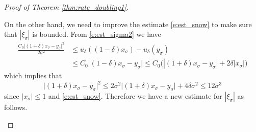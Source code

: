 \documentclass[11pt,reqno]{amsart}
\numberwithin{figure}{section}
\theoremstyle{plain}
\theoremstyle{remark}
\numberwithin{equation}{section}
\begin{document}
\begin{proof}[Proof of Theorem \ref{thm:rate_doubling1}]
\begin{enumerate}
\noindent On the other hand, we need to improve the estimate \eqref{e:est_snow} to make sure that $|\xi_\sigma|$ is bounded. From \eqref{e:est_sigma2} we have
\begin{align*}
    \frac{C_0\big|(1+\delta)x_\sigma - y_\sigma\big|^2}{2\sigma^2} &\leq u_\delta((1-\delta)x_\sigma) - u_\delta(y_\sigma) \\
    &\leq C_0\big|(1-\delta)x_\sigma - y_\sigma\big| \leq C_0\Big(|(1+\delta)x_\sigma - y_\sigma| + 2\delta|x_\sigma|\Big)
\end{align*}
which implies that 
\begin{equation*}
    \big|(1+\delta)x_\sigma - y_\sigma\big|^2 \leq 2\sigma^2 \big|(1+\delta)x_\sigma - y_\sigma\big| + 4\delta \sigma^2 \leq 12\sigma^3 
\end{equation*}
since $|x_\sigma|\leq 1$ and \eqref{e:est_snow}. Therefore we have a new estimate for $|\xi_\sigma|$ as follows.


\end{enumerate}
\end{proof}
\end{document}

